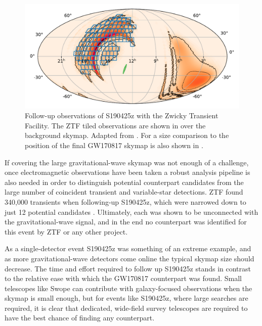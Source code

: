 \begin{colsection}
\newpage

\begin{figure}[t]
    \begin{center}
        \includegraphics[width=0.9\linewidth]{images/190425_ztf.pdf}
    \end{center}
    \caption[Follow-up observations of S190425z with ZTF]{
        Follow-up observations of S190425z with the Zwicky Transient Facility. The ZTF tiled observations are shown in  over the background skymap. Adapted from \citet{S190425z_ZTF}. For a size comparison to  the position of the final GW170817 skymap is also shown in .
        }\label{fig:ztf}
\end{figure}

If covering the large gravitational-wave skymap was not enough of a challenge, once electromagnetic observations have been taken a robust analysis pipeline is also needed in order to distinguish potential counterpart candidates from the large number of coincident transient and variable-star detections. ZTF found 340,000 transients when following-up S190425z, which were narrowed down to just 12 potential candidates \citep{S190425z_ZTF}. Ultimately, each was shown to be unconnected with the gravitational-wave signal, and in the end no counterpart was identified for this event by ZTF or any other project.

As a single-detector event S190425z was something of an extreme example, and as more gravitational-wave detectors come online the typical skymap size should decrease. The time and effort required to follow up S190425z stands in contrast to the relative ease with which the GW170817 counterpart was found. Small telescopes like Swope can contribute with galaxy-focused observations when the skymap is small enough, but for events like S190425z, where large searches are required, it is clear that dedicated, wide-field survey telescopes are required to have the best chance of finding any counterpart.

\newpage

\end{colsection}

